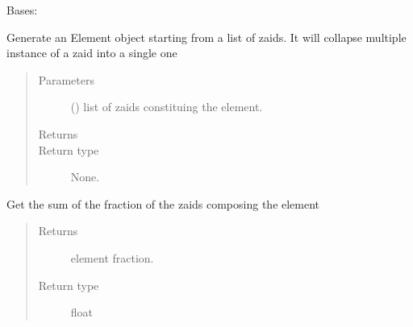 \documentclass[letterpaper,10pt,english]{sphinxmanual}
\begin{document}
\begin{fulllineitems}
\label{\detokenize{api/inputgeneration:matreader.Element}}
\sphinxAtStartPar
Bases: 

\sphinxAtStartPar
Generate an Element object starting from a list of zaids.
It will collapse multiple instance of a zaid into a single one
\begin{quote}\begin{description}
\item[{Parameters}] \leavevmode
\sphinxAtStartPar
{} () \textendash{} list of zaids constituing the element.

\item[{Returns}] \leavevmode
\sphinxAtStartPar


\item[{Return type}] \leavevmode
\sphinxAtStartPar
None.

\end{description}\end{quote}

\begin{fulllineitems}
\label{\detokenize{api/inputgeneration:matreader.Element.get_fraction}}
\sphinxAtStartPar
Get the sum of the fraction of the zaids composing the element
\begin{quote}\begin{description}
\item[{Returns}] \leavevmode
\sphinxAtStartPar
{} \textendash{} element fraction.

\item[{Return type}] \leavevmode
\sphinxAtStartPar
float

\end{description}\end{quote}

\end{fulllineitems}



\end{fulllineitems}
\end{document}
